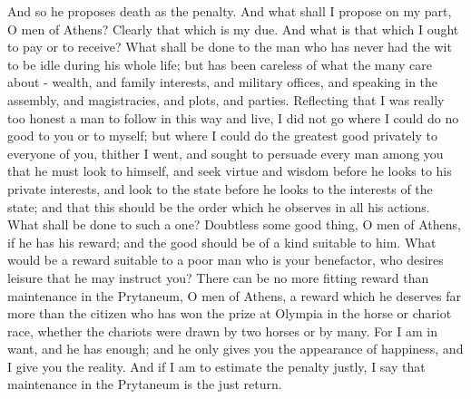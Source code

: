 And so he proposes death as the penalty. And what shall I propose
on my part, O men of Athens? Clearly that which is my due. And what
is that which I ought to pay or to receive? What shall be done to
the man who has never had the wit to be idle during his whole life;
but has been careless of what the many care about - wealth, and family
interests, and military offices, and speaking in the assembly, and
magistracies, and plots, and parties. Reflecting that I was really
too honest a man to follow in this way and live, I did not go where
I could do no good to you or to myself; but where I could do the greatest
good privately to everyone of you, thither I went, and sought to persuade
every man among you that he must look to himself, and seek virtue
and wisdom before he looks to his private interests, and look to the
state before he looks to the interests of the state; and that this
should be the order which he observes in all his actions. What shall
be done to such a one? Doubtless some good thing, O men of Athens,
if he has his reward; and the good should be of a kind suitable to
him. What would be a reward suitable to a poor man who is your benefactor,
who desires leisure that he may instruct you? There can be no more
fitting reward than maintenance in the Prytaneum, O men of Athens,
a reward which he deserves far more than the citizen who has won the
prize at Olympia in the horse or chariot race, whether the chariots
were drawn by two horses or by many. For I am in want, and he has
enough; and he only gives you the appearance of happiness, and I give
you the reality. And if I am to estimate the penalty justly, I say
that maintenance in the Prytaneum is the just return. 

